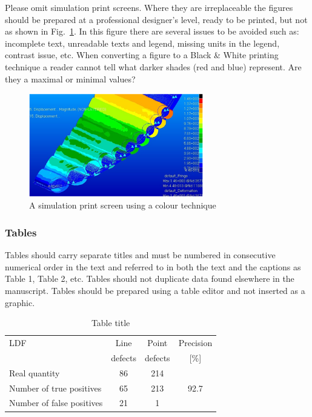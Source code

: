 \documentclass[10pt]{JoME}
\begin{document}
  

Please omit simulation print screens. Where they are irreplaceable the figures should be prepared at a professional designer’s level, ready to be printed, but not as shown in Fig.~\ref{figD}. In this figure there are several issues to be avoided such as: incomplete text, unreadable texts and legend, missing units in the legend, contrast issue, etc. When converting a figure to a Black \& White printing technique a reader cannot tell what darker shades (red and blue) represent. Are they a maximal or minimal values? 

\begin{figure}[h]
\includegraphics[width=76.5mm]{fig4.png}
\caption{A simulation print screen using a colour technique\label{figD}}
\end{figure}


\subsubsection{Tables}

Tables should carry separate titles and must be numbered in consecutive numerical order in the text and referred to in both the text and the captions as Table 1, Table 2, etc. Tables should not duplicate data found elsewhere in the manuscript. Tables should be prepared using a table editor and not inserted as a graphic.

\begin{table}[h]
\caption{Table title\label{tabA}}
\medskip\fontsize{10}{12}\selectfont
\begin{tabular}{lccc}
\hline
LDF	& Line &	Point  & Precision \\
          &  defects &  defects  &  [\%] \\
\hline
Real quantity  & 86   &  214  &   \\
Number of true positives  & 65	& 213 &  92.7  \\   	
Number of false positives & 21 & 1	\\
\hline
\end{tabular}
\end{table}
\end{document}
